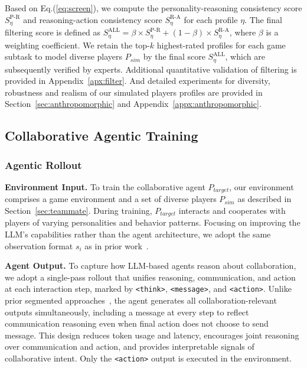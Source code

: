 \documentclass{article}
\theoremstyle{plain}
\theoremstyle{definition}
\theoremstyle{remark}
\begin{document}
Based on Eq.(\ref{eq:screen}), we compute the personality-reasoning consistency score ${S}^{\text{P-R}}_{\eta}$ and reasoning-action consistency score ${S}^{\text{R-A}}_{\eta}$ for each profile $\eta$. The final filtering score is defined as ${S}^{\text{ALL}}_{\eta}=\beta \times {S}^{\text{P-R}}_{\eta} + (1-\beta) \times {S}^{\text{R-A}}_{\eta}$, where $\beta$ is a weighting coefficient. We retain the top-$k$ highest-rated profiles for each game subtask to model diverse players $P_{sim}$ by the final score ${S}^{\text{ALL}}_{\eta}$, which are subsequently verified by experts. Additional quantitative validation of filtering is provided in Appendix~\ref{apx:filter}. And detailed experiments for diversity, robustness and realism of our simulated players profiles are provided in Section~\ref{sec:anthropomorphic} and Appendix~\ref{appx:anthropomorphic}. 



\subsection{Collaborative Agentic Training}\label{method:RL}

\subsubsection{Agentic Rollout}\label{rollout}

\textbf{Environment Input.} To train the collaborative agent $P_{target}$, our environment comprises a game environment and a set of diverse players $P_{sim}$ as described in Section~\ref{sec:teammate}. During training, $P_{target}$ interacts and cooperates with players of varying personalities and behavior patterns. Focusing on improving the LLM’s capabilities rather than the agent architecture, we adopt the same observation format $s_i$ as in prior work~\cite{ZhangYHWLSZZLZC24,ZhangDSZDTSG24}.


\textbf{Agent Output.} To capture how LLM-based agents reason about collaboration, we adopt a single-pass rollout that unifies reasoning, communication, and action at each interaction step, marked by \texttt{<think>}, \texttt{<message>}, and \texttt{<action>}. Unlike prior segmented approaches~\cite{ZhangDSZDTSG24}, the agent generates all collaboration-relevant outputs simultaneously, including a message at every step to reflect communication reasoning even when final action does not choose to send message. This design reduces token usage and latency, encourages joint reasoning over communication and action, and provides interpretable signals of collaborative intent. Only the \texttt{<action>} output is executed in the environment.
\end{document}
